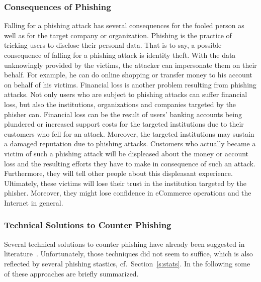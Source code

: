 \subsubsection{Consequences of Phishing}
Falling for a phishing attack has several consequences for the fooled person as well as for the target company or organization. Phishing is the practice of tricking users to disclose their personal data. That is to say, a possible consequence of falling for a phishing attack is identity theft. With the data unknowingly provided by the victims, the attacker can impersonate them on their behalf. For example, he can do online shopping or transfer money to his account on behalf of his victims. Financial loss is another problem resulting from phishing attacks. Not only users who are subject to phishing attacks can suffer financial loss, but also the institutions, organizations and companies targeted by the phisher can. Financial loss can be the result of users' banking accounts being plundered or increased support costs for the targeted institutions due to their customers who fell for an attack. Moreover, the targeted institutions may sustain a damaged reputation due to phishing attacks. Customers who actually became a victim of such a phishing attack will be displeased about the money or account loss and the resulting efforts they have to make in consequence of such an attack. Furthermore, they will tell other people about this displeasant experience. Ultimately, these victims will lose their trust in the institution targeted by the phisher. Moreover, they might lose confidence in eCommerce operations and the Internet in general.

\subsubsection{Technical Solutions to Counter Phishing}

Several technical solutions to counter phishing have already been suggested in literature~\cite{purkait2012phishing}. Unfortunately, those techniques did not seem to suffice, which is also reflected by several phishing stastics, cf.~Section~\ref{s:stats}. In the following some of these approaches are briefly summarized.

